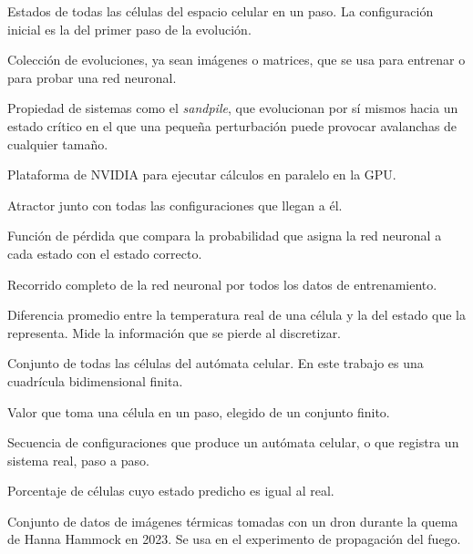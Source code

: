 \begin{description}[leftmargin=1.5em, labelindent=0pt, itemsep=4pt]
	\item[Configuración] Estados de todas las células del espacio celular en un paso. La configuración inicial es la del primer paso de la evolución.

	\item[Conjunto de datos] Colección de evoluciones, ya sean imágenes o matrices, que se usa para entrenar o para probar una red neuronal.

	\item[Criticalidad autoorganizada] Propiedad de sistemas como el \textit{sandpile}, que evolucionan por sí mismos hacia un estado crítico en el que una pequeña perturbación puede provocar avalanchas de cualquier tamaño.

	\item[CUDA] Plataforma de NVIDIA para ejecutar cálculos en paralelo en la GPU.

	\item[Cuenca de atracción] Atractor junto con todas las configuraciones que llegan a él.

	\item[Entropía cruzada] Función de pérdida que compara la probabilidad que asigna la red neuronal a cada estado con el estado correcto.

	\item[Época] Recorrido completo de la red neuronal por todos los datos de entrenamiento.

	\item[Error de cuantización] Diferencia promedio entre la temperatura real de una célula y la del estado que la representa. Mide la información que se pierde al discretizar.

	\item[Espacio celular] Conjunto de todas las células del autómata celular. En este trabajo es una cuadrícula bidimensional finita.

	\item[Estado] Valor que toma una célula en un paso, elegido de un conjunto finito.

	\item[Evolución] Secuencia de configuraciones que produce un autómata celular, o que registra un sistema real, paso a paso.

	\item[Exactitud] Porcentaje de células cuyo estado predicho es igual al real.

	\item[FLAME~3] Conjunto de datos de imágenes térmicas tomadas con un dron durante la quema de Hanna Hammock en 2023. Se usa en el experimento de propagación del fuego.


\end{description}
